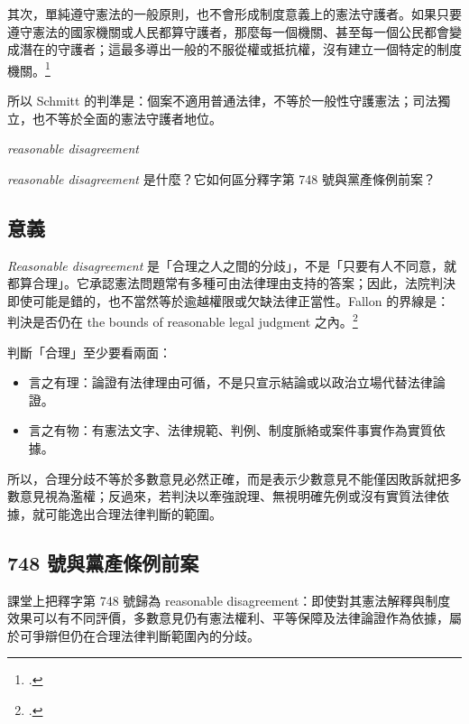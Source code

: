 其次，單純遵守憲法的一般原則，也不會形成制度意義上的憲法守護者。如果只要遵守憲法的國家機關或人民都算守護者，那麼每一個機關、甚至每一個公民都會變成潛在的守護者；這最多導出一般的不服從權或抵抗權，沒有建立一個特定的制度機關。\footcites[89--90]{schmitt2015}[21--22]{schmitt1931}

所以 Schmitt 的判準是：個案不適用普通法律，不等於一般性守護憲法；司法獨立，也不等於全面的憲法守護者地位。


\begin{qaprompt}
\emph{reasonable disagreement}
\end{qaprompt}

\begin{qaquestion}
\emph{reasonable disagreement} 是什麼？它如何區分釋字第 748 號與黨產條例前案？
\end{qaquestion}

\subsection{意義}

\emph{Reasonable disagreement} 是「合理之人之間的分歧」，不是「只要有人不同意，就都算合理」。它承認憲法問題常有多種可由法律理由支持的答案；因此，法院判決即使可能是錯的，也不當然等於逾越權限或欠缺法律正當性。Fallon 的界線是：判決是否仍在 the bounds of reasonable legal judgment 之內。\footcite[38, 40]{kelsen2015}

判斷「合理」至少要看兩面：

\begin{itemize}
\tightlist
\item
  言之有理：論證有法律理由可循，不是只宣示結論或以政治立場代替法律論證。
\item
  言之有物：有憲法文字、法律規範、判例、制度脈絡或案件事實作為實質依據。
\end{itemize}

所以，合理分歧不等於多數意見必然正確，而是表示少數意見不能僅因敗訴就把多數意見視為濫權；反過來，若判決以牽強說理、無視明確先例或沒有實質法律依據，就可能逸出合理法律判斷的範圍。

\subsection{748 號與黨產條例前案}

課堂上把釋字第 748 號歸為 reasonable disagreement：即使對其憲法解釋與制度效果可以有不同評價，多數意見仍有憲法權利、平等保障及法律論證作為依據，屬於可爭辯但仍在合理法律判斷範圍內的分歧。

